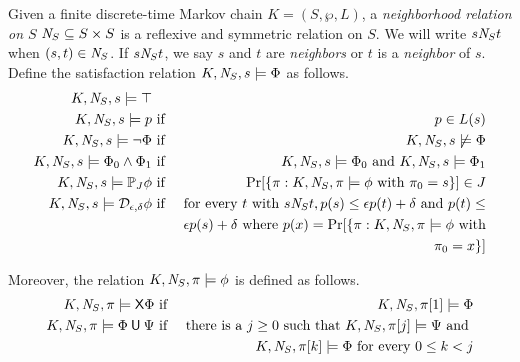 
Given a finite discrete-time Markov chain $K = (S, \wp, L)$, a
\emph{neighborhood relation on $S$} $\mathit{N}_{S} \subseteq S \times S$
is a reflexive and symmetric relation on $S$. We will write $s
\mathit{N}_{S} t$ when $(s, t) \in \mathit{N}_{S}$. If $s \mathit{N}_{S} t$,
we say $s$ and $t$ are \emph{neighbors} or $t$ is a \emph{neighbor} of
$s$. Define the satisfaction relation $K, \mathit{N}_{S}, s
\models \Phi$ as follows.
\begin{eqnarray*}
  K, \mathit{N}_{S}, s \models \top\\
  K, \mathit{N}_{S}, s \models p
  & \textmd{ if } &
  p \in L(s)\\
  K, \mathit{N}_{S}, s \models \neg \Phi
  & \textmd{ if } &
  K, \mathit{N}_{S}, s \not\models \Phi\\
  K, \mathit{N}_{S}, s \models \Phi_0 \wedge \Phi_1
  & \textmd{ if } &
  K, \mathit{N}_{S}, s \models \Phi_0 \textmd{ and }
  K, \mathit{N}_{S}, s \models \Phi_1\\
  K, \mathit{N}_{S}, s \models \mathbb{P}_{J} \phi
  & \textmd{ if } &
  \Pr [\{ \pi : K, \mathit{N}_{S}, \pi \models \phi \textmd{ with }
                    \pi_0 = s\}] \in J \\
  K, \mathit{N}_{S}, s \models \mathcal{D}_{{\epsilon}, {\delta}} \phi
  & \textmd{ if } & 
  \textmd{for every } t \textmd{ with }  s \mathit{N}_{S} t,
      p(s) \leq \epsilon p(t) + \delta \textmd{ and } 
      p(t) \leq \\
  & & \epsilon p(s)  + \delta  \textmd{ where } p(x) = \Pr [\{
      \pi : K, \mathit{N}_{S}, \pi \models \phi \textmd{ with}\\
  & &  \pi_0 = x \}]
\end{eqnarray*}

Moreover, the relation $K, \mathit{N}_{S}, \pi \models \phi$ is defined as
follows.
\begin{eqnarray*}
  K, \neighbor{S}, \pi \models \X \Phi
  & \textmd{ if } &
  K, \neighbor{S}, \pi[1] \models \Phi\\
  K, \neighbor{S}, \pi \models \Phi \until \Psi 
  & \textmd{ if } &
  \textmd{there is a } j \geq 0 \textmd{ such that }
  K, \neighbor{S}, \pi[j] \models \Psi \textmd{ and } \\
  & & K, \neighbor{S}, \pi[k] \models \Phi
      \textmd{ for every } 0 \leq k < j
\hide{
  K, \neighbor{S}, \pi \models \Phi \buntil{n} \Psi 
  & \textmd{ if } &
  \textmd{there is a } 0 \leq j \leq n \textmd{ such that }
  K, \neighbor{S}, \pi[j] \models \Psi \textmd{ and } \\
  & & K, \neighbor{S}, \pi[k] \models \Phi
      \textmd{ for every } 0 \leq k < j
}
\end{eqnarray*}

